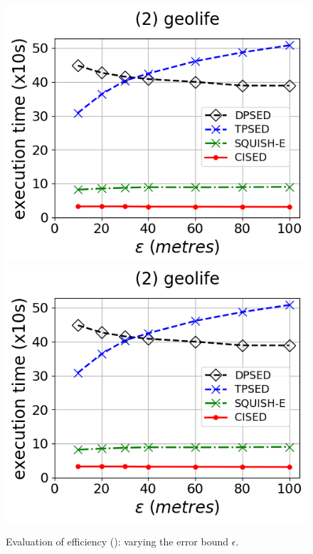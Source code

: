 \begin{figure}[tb!]
	\includegraphics[scale=0.315]{Figures/Exp-time-epsilon-geolife.png}	\hspace{1ex}
	\includegraphics[scale=0.315]{Figures/Exp-time-epsilon-geolife.png}	\hspace{1ex}
	\vspace{-2.5ex}
	\caption{\small Evaluation of efficiency (\sed): varying the error bound $\epsilon$.}\label{fig:time-epsilon-sed}
	\vspace{-1ex}
\end{figure}

